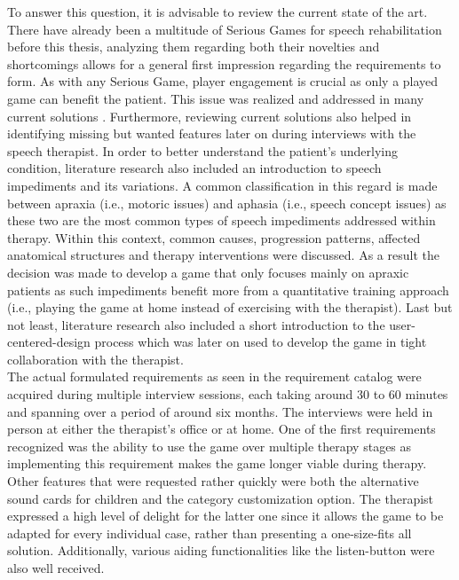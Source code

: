 \documentclass[draft,final]{vutinfth} %
\begin{document}
To answer this question, it is advisable to review the current state of the art. There have already been a multitude of Serious Games for speech rehabilitation before this thesis, analyzing them regarding both their novelties and shortcomings allows for a general first impression regarding the requirements to form. As with any Serious Game, player engagement is crucial as only a played game can benefit the patient. This issue was realized and addressed in many current solutions \cite{Phonak, hair2021longitudinal, navarro2014talking}. Furthermore, reviewing current solutions also helped in identifying missing but wanted features later on during interviews with the speech therapist. In order to better understand the patient's underlying condition, literature research also included an introduction to speech impediments and its variations. A common classification in this regard is made between apraxia (i.e., motoric issues) and aphasia (i.e., speech concept issues) as these two are the most common types of speech impediments addressed within therapy. Within this context, common causes, progression patterns, affected anatomical structures and therapy interventions were discussed. As a result the decision was made to develop a game that only focuses mainly on apraxic patients as such impediments benefit more from a quantitative training approach (i.e., playing the game at home instead of exercising with the therapist). Last but not least, literature research also included a short introduction to the user-centered-design process which was later on used to develop the game in tight collaboration with the therapist. \\

The actual formulated requirements as seen in the requirement catalog were acquired during multiple interview sessions, each taking around 30 to 60 minutes and spanning over a period of around six months. The interviews were held in person at either the therapist's office or at home. One of the first requirements recognized was the ability to use the game over multiple therapy stages as implementing this requirement makes the game longer viable during therapy. Other features that were requested rather quickly were both the alternative sound cards for children and the category customization option. The therapist expressed a high level of delight for the latter one since it allows the game to be adapted for every individual case, rather than presenting a one-size-fits all solution. Additionally, various aiding functionalities like the listen-button were also well received. \\
\end{document}
